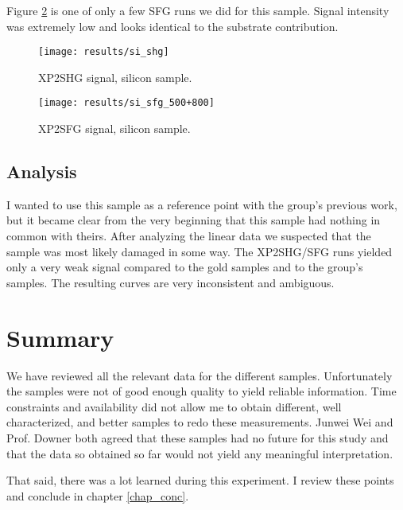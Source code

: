 Figure \ref{fig_si_sfg} is one of only a few SFG runs we did for this sample. Signal intensity was extremely low and looks identical to the substrate contribution.

\begin{figure}[h]
\centering
\texttt{[image: results/si\_shg]}
\caption{XP2SHG signal, silicon sample.\label{fig_si_shg}}
\end{figure}

\begin{figure}[H]
\centering
\texttt{[image: results/si\_sfg\_500+800]}
\caption{XP2SFG signal, silicon sample.\label{fig_si_sfg}}
\end{figure}

\subsection{Analysis}
I wanted to use this sample as a reference point with the group's previous work, but it became clear from the very beginning that this sample had nothing in common with theirs. After analyzing the linear data we suspected that the sample was most likely damaged in some way. The XP2SHG/SFG runs yielded only a very weak signal compared to the gold samples and to the group's samples. The resulting curves are very inconsistent and ambiguous.

\section{Summary}
We have reviewed all the relevant data for the different samples. Unfortunately the samples were not of good enough quality to yield reliable information. Time constraints and availability did not allow me to obtain different, well characterized, and better samples to redo these measurements. Junwei Wei and Prof. Downer both agreed that these samples had no future for this study and that the data so obtained so far would not yield any meaningful interpretation.

That said, there was a lot learned during this experiment. I review these points and conclude in chapter \ref{chap_conc}.
